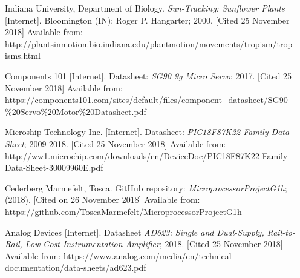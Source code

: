 \documentclass[journal]{Imperial_lab_report}
\begin{document}
\begin{thebibliography}{5}
 Indiana University, Department of Biology. \textit{Sun-Tracking: Sunflower Plants} [Internet]. Bloomington (IN): Roger P. Hangarter; 2000. [Cited 25 November 2018] Available from: http://plantsinmotion.bio.indiana.edu/plantmotion/movements/tropism/trop\\isms.html 

 Components 101 [Internet]. Datasheet: \textit{SG90 9g Micro Servo}; 2017. [Cited 25 November 2018]
Available from: https://components101.com/sites/default/files/component\_datasheet/SG90\\\%20Servo\%20Motor\%20Datasheet.pdf
	
 Microship Technology Inc. [Internet]. Datasheet: \textit{PIC18F87K22 Family Data Sheet}; 2009-2018. [Cited 25 November 2018]
Available from: http://ww1.microchip.com/downloads/en/DeviceDoc/PIC18F87K22-Family-Data-Sheet-30009960E.pdf 

 Cederberg Marmefelt, Tosca. GitHub repository: \textit{MicroprocessorProjectG1h}; (2018). [Cited on 26 November 2018] Available from: https://github.com/ToscaMarmefelt/MicroprocessorProjectG1h

Analog Devices [Internet]. Datasheet \textit{AD623: Single and Dual-Supply, Rail-to-Rail, Low Cost Instrumentation Amplifier}; 2018. [Cited 25 November 2018] Available from: https://www.analog.com/media/en/technical-documentation/data-sheets/ad623.pdf

\end{thebibliography}


\end{document}
